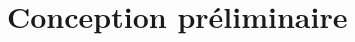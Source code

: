 \documentclass[a4paper,10pt]{report}
\begin{document}
%
%
%
%
%
%
%
%
%
%
%
%
% 


\chapter{Conception préliminaire}
\end{document}
